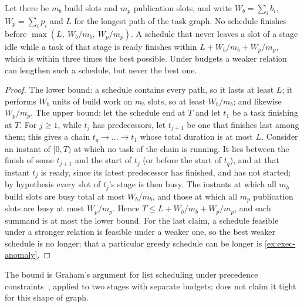 \begin{proposition}
\label{prop:exec-budget}
Let there be $m_b$ build slots and $m_p$ publication slots, and write $W_b =
\sum_i b_i$, $W_p = \sum_i p_i$ and $L$ for the longest path of the task
graph. No schedule finishes before $\max(L,\ W_b/m_b,\ W_p/m_p)$. A schedule
that never leaves a slot of a stage idle while a task of that stage is ready
finishes within $L + W_b/m_b + W_p/m_p$, which is within three times the best
possible. Under budgets a weaker relation can lengthen such a schedule, but
never the best one.
\end{proposition}

\begin{proof}
The lower bound: a schedule contains every path, so it lasts at least $L$; it
performs $W_b$ units of build work on $m_b$ slots, so at least $W_b/m_b$; and
likewise $W_p/m_p$. The upper bound: let the schedule end at $T$ and let $t_1$
be a task finishing at $T$. For $j \ge 1$, while $t_j$ has predecessors, let
$t_{j+1}$ be one that finishes last among them; this gives a chain $t_q \to
\dots \to t_1$ whose total duration is at most $L$. Consider an instant of
$[0, T)$ at which no task of the chain is running. It lies between the finish
of some $t_{j+1}$ and the start of $t_j$ (or before the start of $t_q$), and
at that instant $t_j$ is ready, since its latest predecessor has finished, and
has not started; by hypothesis every slot of $t_j$'s stage is then busy. The
instants at which all $m_b$ build slots are busy total at most $W_b/m_b$, and
those at which all $m_p$ publication slots are busy at most $W_p/m_p$. Hence $T
\le L + W_b/m_b + W_p/m_p$, and each summand is at most the lower bound. For
the last claim, a schedule feasible under a stronger relation is feasible under
a weaker one, so the best weaker schedule is no longer; that a particular
greedy schedule can be longer is \cref{ex:exec-anomaly}.
\end{proof}

The bound is Graham's argument for list scheduling under precedence
constraints~\cite{graham66,graham69}, applied to two stages with separate
budgets;  does not claim it tight for this shape of graph.

